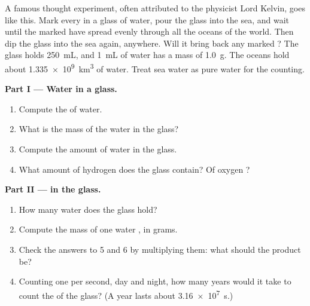 \begin{problem}
\label{pb:g10:the-mole:1}
A famous thought experiment, often attributed to the physicist Lord Kelvin,
goes like this. Mark every  in a glass of water, pour the glass
into the sea, and wait until the marked  have spread evenly
through all the oceans of the world. Then dip the glass into the sea
again, anywhere. Will it bring back any marked ? The glass holds
\qty{250}{mL}, and \qty{1}{mL} of water has a mass of \qty{1.0}{g}. The
oceans hold about \qty{1.335e9}{km^3} of water. Treat sea water as pure
water for the counting.

\medskip
\noindent\textbf{Part I --- Water in a glass.}
\begin{enumerate}
  \item Compute the  of water.
  \item What is the mass of the water in the glass?
  \item Compute the amount of water  in the glass.
  \item What amount of hydrogen  does the glass contain? Of oxygen
        ?
\end{enumerate}

\medskip
\noindent\textbf{Part II ---  in the glass.}
\begin{enumerate}[resume]
  \item How many water  does the glass hold?
  \item Compute the mass of one water , in grams.
  \item Check the answers to 5 and 6 by multiplying them: what should the
        product be?
  \item Counting one  per second, day and night, how many years
        would it take to count the  of the glass? (A year lasts
        about \qty{3.16e7}{s}.)
\end{enumerate}


\end{problem}
